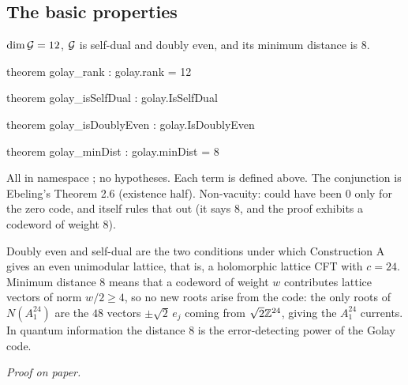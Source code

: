 \subsection{The basic properties}

\begin{theorem}\label{ch02:thm:golay}
$\dim\mathcal{G}=12$, $\mathcal{G}$ is self-dual and doubly even, and its minimum distance is $8$.
\end{theorem}
\begin{leancode}
theorem golay_rank : golay.rank = 12

theorem golay_isSelfDual : golay.IsSelfDual

theorem golay_isDoublyEven : golay.IsDoublyEven

theorem golay_minDist : golay.minDist = 8
\end{leancode}
\begin{dictionary}
All in namespace ; no hypotheses.  Each term is defined above.  The conjunction is
Ebeling's Theorem 2.6 (existence half).  Non-vacuity:  could have been $0$ only for
the zero code, and  itself rules that out (it says $8$, and the proof
exhibits a codeword of weight $8$).
\end{dictionary}
\begin{physics}
Doubly even and self-dual are the two conditions under which Construction A gives an even unimodular lattice, that is, a holomorphic lattice CFT with $c=24$. Minimum distance $8$ means that a codeword of weight $w$ contributes lattice vectors of norm $w/2\ge4$, so no new roots arise from the code: the only roots of $N(A_1^{24})$ are the $48$ vectors $\pm\sqrt2\,e_j$ coming from $\sqrt2{\mathbb{Z}}^{24}$, giving the $A_1^{24}$ currents. In quantum information the distance $8$ is the error-detecting power of the Golay code.
\end{physics}
\emph{Proof on paper.}
